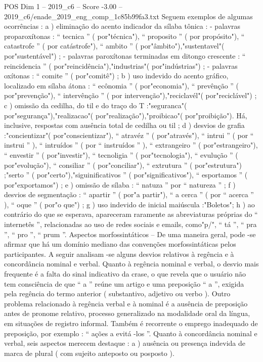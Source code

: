 \begin{textsample}{POS Dim 1 – 2019\_c6 – Score -3.00 – 2019\_c6/enade\_2019\_eng\_comp\_1c85b99fa3.txt}
Seguem exemplos de algumas ocorrências : a ) eliminação do acento indicador da sílaba tônica : - palavras proparoxítonas : “ tecnica ” ( por"técnica"), “ proposito ” ( por propósito"), “ catastrofe ” ( por catástrofe"), “ ambito ” ( por"âmbito"),"sustentavel"( por"sustentável") ; - palavras paroxítonas terminadas em ditongo crescente : “ reincidencia ” ( por"reincidência"),"industrias"( por"indústrias") ; - palavras oxítonas : “ comite ” ( por"comitê") ; b ) uso indevido do acento gráfico, localizado em sílaba átona : “ ecônomia ” ( por"economia"), “ prevênção ” ( por"prevenção"), “ intervênção ” ( por intervenção"),"reciclavél"( por"reciclável") ; c ) omissão da cedilha, do til e do traço do T :"seguranca"( por"segurança"),"realizacao"( por"realização"),"proibicao"( por"proibição").
Há, inclusive, respostas com ausência total de cedilha ou til ; d ) desvios de grafia :"concientizar"( por"conscientizar"), “ atravéz ” ( por"através"), “ intrui ” ( por “ instrui ” ), “ intruídos ” ( por “ instruídos ” ), “ extrangeiro ” ( por"estrangeiro"), “ envestir ” ( por"investir"), “ tecnoligia ” ( por"tecnologia"), “ evulução ” ( por"evolução"), “ consiliar ” ( por"conciliar"), “ extrutura ” ( por"estrutura") ;"serto ” ( por"certo"),"siguinificativos ” ( por"significativos"), “ esportamos ” ( por"exportamos") ; e ) omissão de sílaba : “ natuza ” por “ natureza ” ; f ) desvios de segmentação : “ apartir ” ( por"a partir"), “ a cerca ” ( por “ acerca ” ), “ oque ” ( por"o que") ; g ) uso indevido de inicial maiúscula :"Boletos"; h ) ao contrário do que se esperava, apareceram raramente as abreviaturas próprias do “ internetês ”, relacionadas ao uso de redes sociais e emails, como"p/", “ tá ”, “ pra ”, “ pro ”, “ prum ”.
Aspectos morfossintáticos – De uma maneira geral, pode -se afirmar que há um domínio mediano das convenções morfossintáticas pelos participantes.
A seguir analisam -se alguns desvios relativos à regência e à concordância nominal e verbal.
Quanto à regência nominal e verbal, o desvio mais frequente é a falta do sinal indicativo da crase, o que revela que o usuário não tem consciência de que “ a ” reúne um artigo e uma preposição “ a ”, exigida pela regência do termo anterior ( substantivo, adjetivo ou verbo ).
Outro problema relacionado à regência verbal e à nominal é a ausência de preposição antes de pronome relativo, processo generalizado na modalidade oral da língua, em situações de registro informal.
Também é recorrente o emprego inadequado de preposição, por exemplo : “ ações a evitá -los ”.
Quanto à concordância nominal e verbal, seis aspectos merecem destaque : a ) ausência ou presença indevida de marca de plural ( com sujeito anteposto ou posposto ).

\end{textsample}
